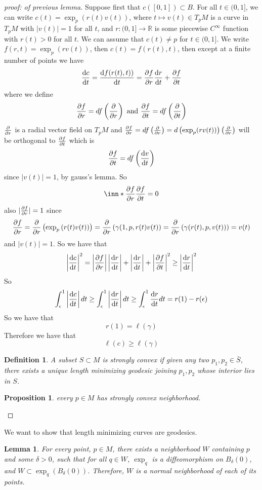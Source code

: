 \documentclass[a4paper]{article}
\newtheorem*{prop}{Proposition}
\newtheorem*{defn}{Definition}
\newtheorem*{lem}{Lemma}
\begin{document}
\begin{proof}[proof: of previous lemma]
  Suppose first that $c([0,1]) \subset B$. For all $t \in (0,1]$, we can write $c(t) = \exp_p(r(t)v(t))$, where $t \mapsto v(t) \in T_pM$ is a curve in $T_pM$ with $|v(t)| = 1$ for all $t$, and $r: (0,1] \rightarrow \mathds{R}$ is some piecewise $C^{\infty}$ function with $r(t) > 0$ for all $t$. We can assume that $c(t) \neq p$ for $t \in (0,1]$. We write $f(r,t) = \exp_p(r v(t))$, then $c(t) = f(r(t),t)$, then except at a finite number of points we have 
  \[
    \dv{c}{t} = \dv{f(r(t), t))}{t} = \pdv{f}{r}\dv{r}{t} + \pdv{f}{t}
  \]
  where we define
  \[
    \pdv{f}{r} = df \left( \pdv{r} \right) \text{ and }  \pdv{f}{t} = df \left( \pdv{t} \right)
  \]
  $\pdv{r}$ is a radial vector field on $T_pM$ and $\pdv{f}{r} = df \left( \pdv{r} \right) = d\left(\exp_p(r v(t))\right) \left( \pdv{r} \right)$ will be orthogonal to $\pdv{f}{t}$ which is
  \[
    \pdv{f}{t} = df \left( \dv{v}{t} \right)
  \]
  since $|v(t)| = 1$, by gauss's lemma. So
  \[
    \inn*{\pdv{f}{r}}{\pdv{f}{t}} = 0
  \]
  also $|\pdv{f}{r}| = 1$ since 
  \[
    \pdv{f}{r} = \pdv{r} \left( \exp_p \left( r(t) v(t) \right) \right) = \pdv{r} \left( \gamma(1, p, r(t)v(t) \right) = \pdv{r} \left( \gamma(r(t), p, v(t)) \right)  = v(t)
  \]
  and $|v(t)| = 1$. So we have that
  \[
    \left| \dv{c}{t} \right|^2 = \left| \pdv{f}{r} \right| \left| \dv{r}{t} \right| + \left| \dv{r}{t} \right| + \left| \pdv{f}{t} \right|^2 \geq \left| \dv{r}{t} \right|^2
  \]
  So
  \[
    \int_{\epsilon}^1 \left| \dv{c}{t} \right| dt \geq \int_{\epsilon}^1 \left| \dv{r}{t} \right| dt \geq \int_{\epsilon}^1 \dv{r}{t} dt = r(1) - r(\epsilon)
  \]
  So we have that
  \[
    r(1) = \ell(\gamma)
  \]
  Therefore we have that
  \[
    \ell(c) \geq \ell(\gamma)
  \]

  \begin{defn}
    A subset $S \subset M$ is strongly convex if given any two $p_1,p_2 \in \bar{S}$, there exists a unique length minimizing geodesic joining $p_1, p_2$ whose interior lies in $S$. 
  \end{defn}
  \begin{prop}
    every $p \in M$ has strongly convex neighborhood.
  \end{prop}
\end{proof}

We want to show that length minimizing curves are geodesics. 

\begin{lem}
  For every point, $p \in M$, there exists a neighborhood $W$ containing $p$ and some $\delta > 0$, such that for all $q \in W$, $\exp_q$ is a diffeomorphism on $B_{\delta}(0)$, and $W \subset \exp_q(B_{\delta}(0))$. Therefore, $W$ is a normal neighborhood of each of its points.
\end{lem}
\end{document}
